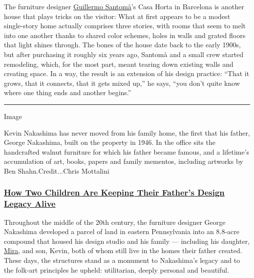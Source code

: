 The furniture designer \href{http://guillermosantoma.com/}{Guillermo
Santomà}'s Casa Horta in Barcelona is another house that plays tricks on
the visitor: What at first appears to be a modest single-story home
actually comprises three stories, with rooms that seem to melt into one
another thanks to shared color schemes, holes in walls and grated floors
that light shines through. The bones of the house date back to the early
1900s, but after purchasing it roughly six years ago, Santomà and a
small crew started remodeling, which, for the most part, meant tearing
down existing walls and creating space. In a way, the result is an
extension of his design practice: ``That it grows, that it connects,
that it gets mixed up,'' he says, ``you don't quite know where one thing
ends and another begins.''

\begin{center}\rule{0.5\linewidth}{\linethickness}\end{center}

Image

Kevin Nakashima has never moved from his family home, the first that his
father, George Nakashima, built on the property in 1946. In the office
sits the handcrafted walnut furniture for which his father became
famous, and a lifetime's accumulation of art, books, papers and family
mementos, including artworks by Ben Shahn.Credit...Chris Mottalini

\hypertarget{how-two-children-are-keeping-their-fathers-design-legacy-alive}{%
\subsubsection{\texorpdfstring{\textbf{\href{https://www.nytimes3xbfgragh.onion/2020/03/16/t-magazine/george-nakashima-legacy.html}{How
Two Children Are Keeping Their Father's Design Legacy
Alive}}}{How Two Children Are Keeping Their Father's Design Legacy Alive}}\label{how-two-children-are-keeping-their-fathers-design-legacy-alive}}

Throughout the middle of the 20th century, the furniture designer George
Nakashima developed a parcel of land in eastern Pennsylvania into an
8.8-acre compound that housed his design studio and his family ---
including his daughter,
\href{https://www.nytimes3xbfgragh.onion/2013/09/05/garden/mira-nakashima-a-daughter-knocks-on-wood.html}{Mira},
and son, Kevin, both of whom still live in the homes their father
created. These days, the structures stand as a monument to Nakashima's
legacy and to the folk-art principles he upheld: utilitarian, deeply
personal and beautiful.

